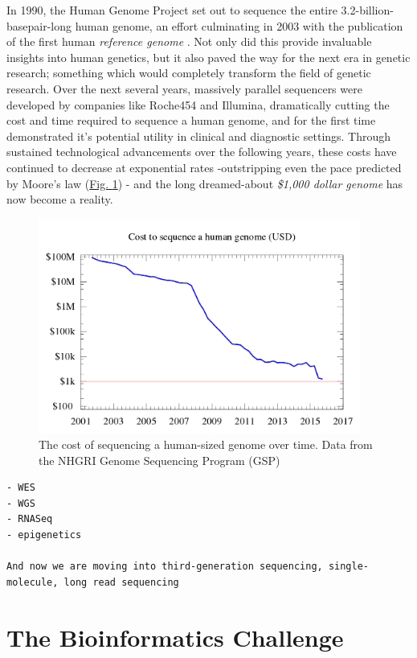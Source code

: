 In 1990, the Human Genome Project \cite{olson1993human} set out to sequence the entire 3.2-billion-basepair-long human genome, an effort culminating in 2003 with the publication of the first human \textit{reference genome} \cite{international2004finishing}. Not only did this provide invaluable insights into human genetics, but it also paved the way for the next era in genetic research; something which would completely transform the field of genetic research. Over the next several years, massively parallel sequencers were developed by companies like Roche454 and Illumina, dramatically cutting the cost and time required to sequence a human genome, and for the first time demonstrated it's potential utility in clinical and diagnostic settings. Through sustained technological advancements over the following years, these costs have continued to decrease at exponential rates -outstripping even the pace predicted by Moore's law (\hyperref[fig:seqcost]{Fig. \ref{fig:seqcost}}) - and the long dreamed-about \textit{\$1,000 dollar genome} \cite{thousanddollargenome} \cite{sequencingcostsNHGRI} has now become a reality.

\begin{figure}[h!]
    \centering
    \includegraphics[width=300pt]{chapters/images/Historic_cost_of_sequencing_a_human_genome.png}
    \caption{The cost of sequencing a human-sized genome over time. Data from the NHGRI Genome Sequencing Program (GSP) }
    \label{fig:seqcost}
\end{figure}

\begin{verbatim}
- WES
- WGS
- RNASeq
- epigenetics

And now we are moving into third-generation sequencing, single-molecule, long read sequencing
\end{verbatim}

\section{The Bioinformatics Challenge}

